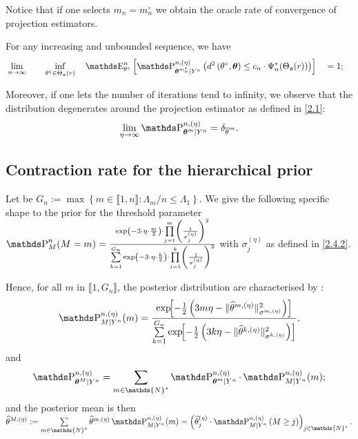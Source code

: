 Notice that if one selects $m_{n} = m_{n}^{\circ}$ we obtain the oracle rate of convergence of projection estimators.




\begin{cor}\label{cor2}
For any increasing and unbounded sequence, we have
\begin{alignat*}{5}
& \lim_{n \rightarrow \infty}&& && \inf\limits_{\theta^{\circ} \in \Theta_{\mathfrak{a}}(r)} && \E_{\theta^{\circ}}^{n}\left[\P_{\boldsymbol{\theta}^{m_{n}^{\star}}\vert Y^{n}}^{n, (\eta)}\left(d^{2}\left(\theta^{\circ}, \boldsymbol{\theta}\right) \leq c_{n} \cdot \Psi^{\star}_{n}(\Theta_{\mathfrak{a}}(r)) \right)\right]&& = 1;
\end{alignat*}
\end{cor}

Moreover, if one lets the number of iterations tend to infinity, we observe that the distribution degenerates around the projection estimator as defined in \textsc{\cref{2.1}}:
\[\lim\limits_{\eta \rightarrow \infty} \P_{\boldsymbol{\theta}^{m} \vert Y^{n}}^{n, (\eta)} = \delta_{\overline{\theta}^{m}}.\]


\subsection{Contraction rate for the hierarchical prior}\label{2.4.3}

Let be $G_{n} := \max\left\{m \in \llbracket 1, n \rrbracket : \Lambda_{m} / n \leq \Lambda_{1}\right\}$.
We give the following specific shape to the prior for the threshold parameter $\P_{M}^{n}(M = m) = \frac{\exp\left(-3 \cdot \eta \cdot \frac{m}{2} \right) \cdot \prod\limits_{j = 1}^{m} \left(\frac{1}{\sigma_{j}^{(\eta)}}\right)^{2}}{\sum\limits_{k =1}^{G_{n}} \exp\left(-3 \cdot \eta \cdot \frac{k}{2} \right) \cdot \prod\limits_{j = 1}^{k} \left(\frac{1}{\sigma_{j}^{(\eta)}}\right)^{2}}$ with $\sigma_{j}^{(\eta)}$ as defined in \textsc{\cref{2.4.2}}.

Hence, for all $m$ in $\llbracket 1, G_{n} \rrbracket$, the posterior distribution are characterised by :
\[\P_{M \vert Y^{n}}^{n, (\eta)}(m) = \frac{\exp\!\!\left[- \frac{1}{2} \left( 3 m \eta - \Vert \widehat{\theta}^{m, (\eta)} \Vert_{\sigma^{m, (\eta)}}^{2} \right)\right] }{\sum\limits_{k = 1}^{G_{n}} \exp\!\!\left[ - \frac{1}{2} \left( 3 k \eta - \Vert \widehat{\theta}^{k, (\eta)} \Vert_{\sigma^{k, (\eta)}}^{2}\right) \right]},\]
and
\[\P_{\boldsymbol{\theta}^{M} \vert Y^{n}}^{n, (\eta)} = \sum\limits_{m \in \mathds{N}^{\star}}\P_{\boldsymbol{\theta}^{m} \vert Y^{n}}^{n, (\eta)} \cdot \P_{M \vert Y^{n}}^{n, (\eta)}(m);\]
and the posterior mean is then $\widehat{\theta}^{M, (\eta)} :=  \sum\limits_{m \in \mathds{N}^{\star}} \widehat{\theta}^{m, (\eta)} \P_{M \vert Y^{n}}^{n, (\eta)}(m) = \left(\widehat{\theta}_{j}^{(\eta)} \cdot \P_{M \vert Y^{n}}^{n, (\eta)} \left(M \geq j\right)\right)_{j \in \mathds{N}^{\star}}.$

